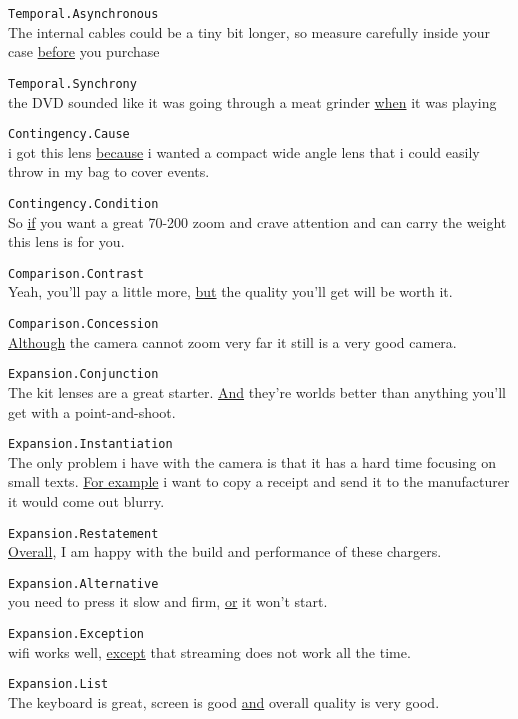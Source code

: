 \documentclass[
    a4paper,%
    12pt,%
    oneside,%
    toc=bibliography,
    final,
]{scrartcl}
\begin{document}
\begin{exe}
\ex\label{ex:pdtb-types-first} \lstinline|Temporal.Asynchronous|\\
The internal cables could be a tiny bit longer, so measure carefully inside your case \underline{before} you purchase

\ex \lstinline|Temporal.Synchrony|\\
the DVD sounded like it was going through a meat grinder \underline{when} it was playing

\ex \lstinline|Contingency.Cause|\\
i got this lens \underline{because} i wanted a compact wide angle lens that i could easily throw in my bag to cover events.

\ex \lstinline|Contingency.Condition|\\
So \underline{if} you want a great 70-200 zoom and crave attention and can carry the weight this lens is for you.

\ex \lstinline|Comparison.Contrast|\\
Yeah, you'll pay a little more, \underline{but} the quality you'll get will be worth it.

\ex \lstinline|Comparison.Concession|\\
\underline{Although} the camera cannot zoom very far it still is a very good camera.

\ex \lstinline|Expansion.Conjunction|\\
The kit lenses are a great starter. \underline{And} they're worlds better than anything you'll get with a point-and-shoot.

\ex \lstinline|Expansion.Instantiation|\\
The only problem i have with the camera is that it has a hard time focusing on small texts. \underline{For example} i want to copy a receipt and send it to the manufacturer it would come out blurry.

\ex \lstinline|Expansion.Restatement|\\
\underline{Overall}, I am happy with the build and performance of these chargers.

\ex \lstinline|Expansion.Alternative|\\
you need to press it slow and firm, \underline{or} it won't start.

\ex \lstinline|Expansion.Exception|\\
wifi works well, \underline{except} that streaming does not work all the time.

\ex\label{ex:pdtb-types-last} \lstinline|Expansion.List|\\
The keyboard is great, screen is good \underline{and} overall quality is very good.
\end{exe}
\end{document}
